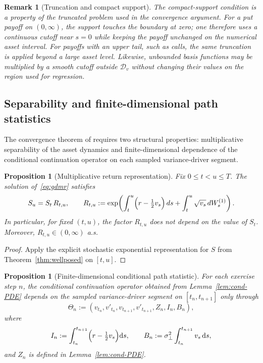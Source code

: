 \documentclass[pdflatex,sn-mathphys-num]{sn-jnl}
\theoremstyle{thmstyleone}%
\newtheorem{proposition}[theorem]{Proposition}
\theoremstyle{thmstylethree}%
\theoremstyle{thmstyletwo}%
\newtheorem{remark}[theorem]{Remark}
\newcommand{\dd}{\mathrm d}
\begin{document}
\begin{remark}[Truncation and compact support]\label{rem:truncation-compact-support}
The compact-support condition is a property of the truncated problem used in the convergence argument. For a put
payoff on $(0,\infty)$, the support touches the boundary at zero; one therefore uses a continuous cutoff near
$s=0$ while keeping the payoff unchanged on the numerical asset interval. For payoffs with an upper tail, such as
calls, the same truncation is applied beyond a large asset level. Likewise, unbounded basis functions may be
multiplied by a smooth cutoff outside $\mathcal D_v$ without changing their values on the region used for
regression.
\end{remark}

\subsection{Separability and finite-dimensional path statistics}
\label{subsec:separability}

The convergence theorem of \cite{farahany2020mixing} requires two structural properties: multiplicative
separability of the asset dynamics and finite-dimensional dependence of the conditional continuation operator on
each sampled variance-driver segment.

\begin{proposition}[Multiplicative return representation]
\label{prop:multiplicative_return}
Fix $0\le t<u\le T$. The solution of~\eqref{eq:gdmr} satisfies
\[
S_u = S_t\,R_{t,u},
\qquad
R_{t,u} := \exp\!\left(\int_t^u\Bigl(r-\tfrac12 v_s\Bigr)\,ds + \int_t^u \sqrt{v_s}\,dW^{(1)}_s\right).
\]
In particular, for fixed $(t,u)$, the factor $R_{t,u}$ does not depend on the value of $S_t$.
Moreover, $R_{t,u}\in(0,\infty)$ a.s.
\end{proposition}

\begin{proof}
Apply the explicit stochastic exponential representation for $S$ from Theorem~\ref{thm:wellposed} on $[t,u]$.
\end{proof}

\begin{proposition}[Finite-dimensional conditional path statistic]
\label{prop:finite_path_statistic}
For each exercise step $n$, the conditional continuation operator obtained from Lemma~\ref{lem:cond-PDE}
depends on the sampled variance-driver segment on $[t_n,t_{n+1}]$ only through
\[
\Theta_n
:=\left(v_{t_n},v'_{t_n},v_{t_{n+1}},v'_{t_{n+1}},Z_n,I_n,B_n\right),
\]
where
\[
I_n:=\int_{t_n}^{t_{n+1}}\Bigl(r-\tfrac12v_s\Bigr)\dd s,\qquad
B_n:=\sigma_\perp^2\int_{t_n}^{t_{n+1}}v_s\,\dd s,
\]
and $Z_n$ is defined in Lemma~\ref{lem:cond-PDE}.
\end{proposition}
\end{document}
